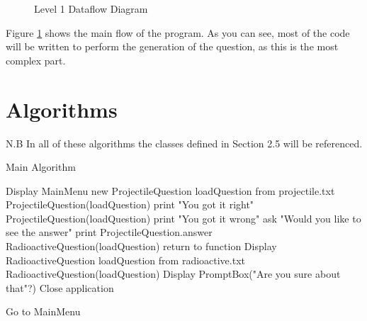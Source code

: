 \begin{figure}[H]
\caption{Level 1 Dataflow Diagram}
\label{dfd}
\end{figure}
Figure \ref{dfd} shows the main flow of the program. As you can see, most of the code will be written to perform the generation of the question, as this is the most complex part.

\section{Algorithms}
N.B In all of these algorithms the classes defined in Section 2.5 will be referenced.
\begin{algorithm}
	\label{mainps}
	\caption{Main Algorithm}
	\begin{algorithmic}[1]
		\State Display MainMenu
			\State new ProjectileQuestion
			\State loadQuestion from projectile.txt
			\State ProjectileQuestion(loadQuestion)
			\State print "You got it right"
			\State ProjectileQuestion(loadQuestion)
			\Else
			\State print "You got it wrong"
			\State ask "Would you like to see the answer"
			\State print ProjectileQuestion.answer
			\State RadioactiveQuestion(loadQuestion)
			\Else
			\State return to function
			\EndIf
			\EndIf
		\EndIf
			\State Display RadioactiveQuestion
			\State loadQuestion from radioactive.txt
			\State RadioactiveQuestion(loadQuestion)
		\EndIf
			\State Display PromptBox("Are you sure about that"?)
				\State Close application
			
			\Else
				\State Go to MainMenu
			\EndIf
		\EndIf
	\end{algorithmic}
\end{algorithm}
